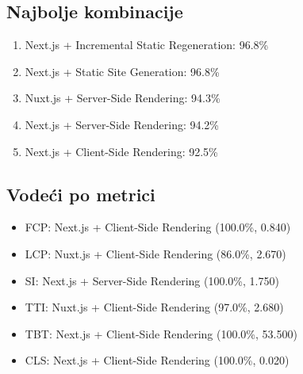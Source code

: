 \subsection{Najbolje kombinacije}
\begin{enumerate}
    \item Next.js + Incremental Static Regeneration: 96.8\%
    \item Next.js + Static Site Generation: 96.8\%
    \item Nuxt.js + Server-Side Rendering: 94.3\%
    \item Next.js + Server-Side Rendering: 94.2\%
    \item Next.js + Client-Side Rendering: 92.5\%
\end{enumerate}

\subsection{Vodeći po metrici}
\begin{itemize}
    \item FCP: Next.js + Client-Side Rendering (100.0\%, 0.840)
    \item LCP: Nuxt.js + Client-Side Rendering (86.0\%, 2.670)
    \item SI: Next.js + Server-Side Rendering (100.0\%, 1.750)
    \item TTI: Nuxt.js + Client-Side Rendering (97.0\%, 2.680)
    \item TBT: Next.js + Client-Side Rendering (100.0\%, 53.500)
    \item CLS: Next.js + Client-Side Rendering (100.0\%, 0.020)
\end{itemize}

